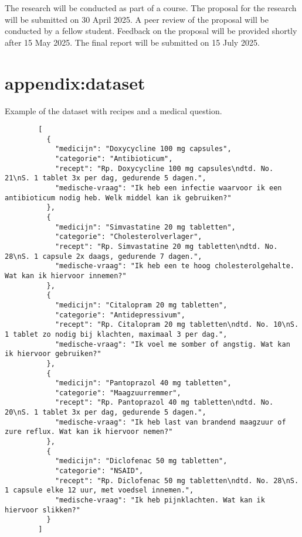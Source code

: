 \documentclass[a4paper,doc,natbib]{apa6}
\begin{document}
    The research will be conducted as part of a course. The proposal for the research will be submitted on 30 April 2025. A peer review of the proposal will be conducted by a fellow student. Feedback on the proposal will be provided shortly after 15 May 2025. The final report will be submitted on 15 July 2025.

    

    \appendix

    \section{appendix:dataset}

    Example of the dataset with recipes and a medical question.

    \begin{verbatim}
        [
          {
            "medicijn": "Doxycycline 100 mg capsules",
            "categorie": "Antibioticum",
            "recept": "Rp. Doxycycline 100 mg capsules\ndtd. No. 21\nS. 1 tablet 3x per dag, gedurende 5 dagen.",
            "medische-vraag": "Ik heb een infectie waarvoor ik een antibioticum nodig heb. Welk middel kan ik gebruiken?"
          },
          {
            "medicijn": "Simvastatine 20 mg tabletten",
            "categorie": "Cholesterolverlager",
            "recept": "Rp. Simvastatine 20 mg tabletten\ndtd. No. 28\nS. 1 capsule 2x daags, gedurende 7 dagen.",
            "medische-vraag": "Ik heb een te hoog cholesterolgehalte. Wat kan ik hiervoor innemen?"
          },
          {
            "medicijn": "Citalopram 20 mg tabletten",
            "categorie": "Antidepressivum",
            "recept": "Rp. Citalopram 20 mg tabletten\ndtd. No. 10\nS. 1 tablet zo nodig bij klachten, maximaal 3 per dag.",
            "medische-vraag": "Ik voel me somber of angstig. Wat kan ik hiervoor gebruiken?"
          },
          {
            "medicijn": "Pantoprazol 40 mg tabletten",
            "categorie": "Maagzuurremmer",
            "recept": "Rp. Pantoprazol 40 mg tabletten\ndtd. No. 20\nS. 1 tablet 3x per dag, gedurende 5 dagen.",
            "medische-vraag": "Ik heb last van brandend maagzuur of zure reflux. Wat kan ik hiervoor nemen?"
          },
          {
            "medicijn": "Diclofenac 50 mg tabletten",
            "categorie": "NSAID",
            "recept": "Rp. Diclofenac 50 mg tabletten\ndtd. No. 28\nS. 1 capsule elke 12 uur, met voedsel innemen.",
            "medische-vraag": "Ik heb pijnklachten. Wat kan ik hiervoor slikken?"
          }
        ]
    \end{verbatim}
\end{document}
